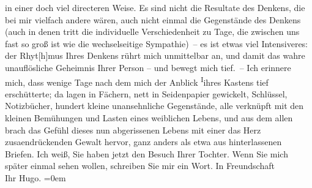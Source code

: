 \begin{ledgroupsized}[t]{13cm}
               in einer doch viel directeren Weise. Es sind nicht die Resultate des Denkens, die bei
               mir vielfach andere wären, auch nicht einmal die Gegenstände des Denkens (auch in
               denen tritt die individuelle Verschiedenheit zu Tage, die zwischen uns fast so groß
               ist wie die wechselseitige Sympathie) – {\pb}es ist etwas viel Intensiveres:
               der Rhyt{[}h{]}mus Ihres Denkens rührt mich unmittelbar an, und damit
               das wahre unauflösliche Geheimnis Ihrer Person – und bewegt mich tief. – Ich erinnere
               mich, dass wenige Tage nach dem \label{K_L02496-1v}\label{K_L02496-1h} mich der Anblick \substVorne{}\textsuperscript{I}\substDazwischen{}i\substHinten{}hres Kastens tief erschütterte; da lagen in Fächern, nett in Seidenpapier
               gewickelt, Schlüssel, Notizbücher, hundert kleine unansehnliche Gegenstände, alle
               verknüpft mit den kleinen Bemühungen und Lasten eines weiblichen Lebens, und aus dem
               allen brach das Gefühl dieses nun abgerissenen Lebens mit einer das Herz zusa{\geminationm}endrückenden Gewalt hervor, ganz anders als etwa aus
               hinterlassenen Briefen.\pend
           \pstart
           Ich weiß, Sie haben jetzt den Besuch Ihrer Tochter. Wenn Sie mich später einmal sehen wollen,
               schreiben Sie mir ein Wort.\pend
           \pstart
           In Freundschaft{\\[\baselineskip]}Ihr \spacefill\mbox{Hugo.}\pend
           \leftskip=0em{}
         
         \endnumbering{}\end{ledgroupsized}  \newcommand{\dateiname}{L02496}\newcommand{\titel}{Hugo Hofmannsthal an Arthur Schnitzler, 29. 12. 1927}\newcommand{\editorInnen}{Martin Anton Müller und Gerd-Hermann Susen}
      
